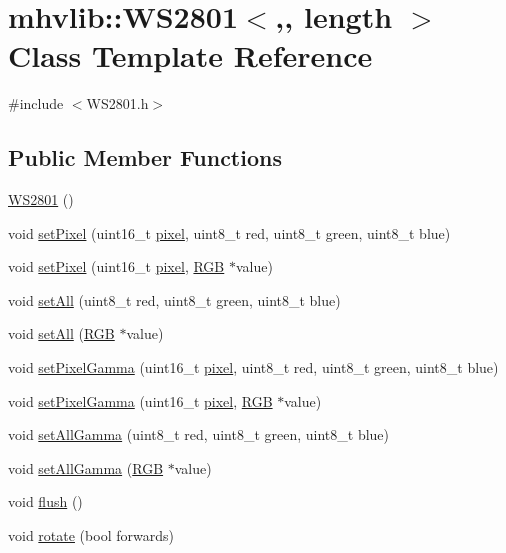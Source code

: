 \hypertarget{classmhvlib_1_1_w_s2801}{\section{mhvlib\-:\-:W\-S2801$<$,, length $>$ Class Template Reference}
\label{classmhvlib_1_1_w_s2801}
}


{\ttfamily \#include $<$W\-S2801.\-h$>$}

\subsection*{Public Member Functions}
\begin{DoxyCompactItemize}
\item 
\hyperlink{classmhvlib_1_1_w_s2801_ad7ec06bd657f3c339ecd5bb152a8243b}{W\-S2801} ()
\item 
void \hyperlink{classmhvlib_1_1_w_s2801_aee5a3eb7f177fbdce4d35176ef0667a5}{set\-Pixel} (uint16\-\_\-t \hyperlink{_display___monochrome___buffered_8h_a9d20fe94f93b6c220969bb9050dfe1dc}{pixel}, uint8\-\_\-t red, uint8\-\_\-t green, uint8\-\_\-t blue)
\item 
void \hyperlink{classmhvlib_1_1_w_s2801_a01b664131230f7850fc266d5c9745517}{set\-Pixel} (uint16\-\_\-t \hyperlink{_display___monochrome___buffered_8h_a9d20fe94f93b6c220969bb9050dfe1dc}{pixel}, \hyperlink{namespacemhvlib_a21a85335ab93f04553238845c70477b1}{R\-G\-B} $\ast$value)
\item 
void \hyperlink{classmhvlib_1_1_w_s2801_ada986388e31bbe1607659277570dc901}{set\-All} (uint8\-\_\-t red, uint8\-\_\-t green, uint8\-\_\-t blue)
\item 
void \hyperlink{classmhvlib_1_1_w_s2801_a4279bc2a230e6ff2272eea0ccde71972}{set\-All} (\hyperlink{namespacemhvlib_a21a85335ab93f04553238845c70477b1}{R\-G\-B} $\ast$value)
\item 
void \hyperlink{classmhvlib_1_1_w_s2801_a3c154d2ab2213aec60e7cc796d8d4d98}{set\-Pixel\-Gamma} (uint16\-\_\-t \hyperlink{_display___monochrome___buffered_8h_a9d20fe94f93b6c220969bb9050dfe1dc}{pixel}, uint8\-\_\-t red, uint8\-\_\-t green, uint8\-\_\-t blue)
\item 
void \hyperlink{classmhvlib_1_1_w_s2801_a2ff6e61e422dcbd57e18b1a97ca62e08}{set\-Pixel\-Gamma} (uint16\-\_\-t \hyperlink{_display___monochrome___buffered_8h_a9d20fe94f93b6c220969bb9050dfe1dc}{pixel}, \hyperlink{namespacemhvlib_a21a85335ab93f04553238845c70477b1}{R\-G\-B} $\ast$value)
\item 
void \hyperlink{classmhvlib_1_1_w_s2801_ad7b8e071f7d7f6fecdc88bc9fbd7645b}{set\-All\-Gamma} (uint8\-\_\-t red, uint8\-\_\-t green, uint8\-\_\-t blue)
\item 
void \hyperlink{classmhvlib_1_1_w_s2801_a4acb88c0c645f6a1fffe3f45ca6cf822}{set\-All\-Gamma} (\hyperlink{namespacemhvlib_a21a85335ab93f04553238845c70477b1}{R\-G\-B} $\ast$value)
\item 
void \hyperlink{classmhvlib_1_1_w_s2801_ae1e9ef95218bc502691cce7fa8e5f711}{flush} ()
\item 
void \hyperlink{classmhvlib_1_1_w_s2801_abfce255825a0ce4fee489b5a0405b3f8}{rotate} (bool forwards)
\end{DoxyCompactItemize}


